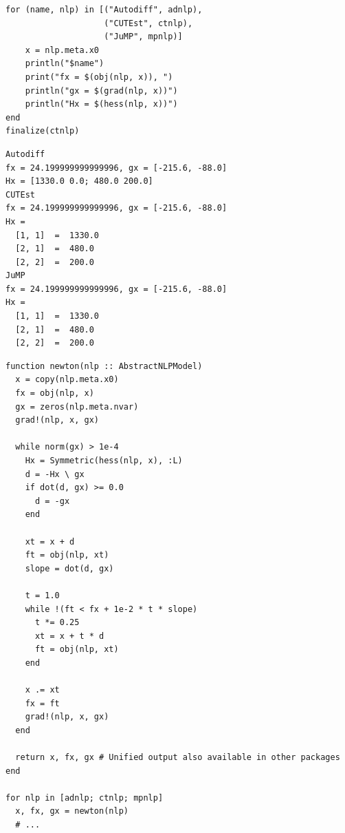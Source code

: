 \begin{frame}[fragile,t]

\begin{minipage}{0.51\textwidth}
\begin{lstlisting}
for (name, nlp) in [("Autodiff", adnlp),
                    ("CUTEst", ctnlp),
                    ("JuMP", mpnlp)]
    x = nlp.meta.x0
    println("$name")
    print("fx = $(obj(nlp, x)), ")
    println("gx = $(grad(nlp, x))")
    println("Hx = $(hess(nlp, x))")
end
finalize(ctnlp)
\end{lstlisting}
\end{minipage}
\begin{minipage}{0.48\textwidth}
\begin{lstlisting}
Autodiff
fx = 24.199999999999996, gx = [-215.6, -88.0]
Hx = [1330.0 0.0; 480.0 200.0]
CUTEst
fx = 24.199999999999996, gx = [-215.6, -88.0]
Hx = 
  [1, 1]  =  1330.0
  [2, 1]  =  480.0
  [2, 2]  =  200.0
JuMP
fx = 24.199999999999996, gx = [-215.6, -88.0]
Hx = 
  [1, 1]  =  1330.0
  [2, 1]  =  480.0
  [2, 2]  =  200.0
\end{lstlisting}
\end{minipage}
\end{frame}

\begin{frame}
\begin{lstlisting}
function newton(nlp :: AbstractNLPModel)
  x = copy(nlp.meta.x0)
  fx = obj(nlp, x)
  gx = zeros(nlp.meta.nvar)
  grad!(nlp, x, gx)

  while norm(gx) > 1e-4
    Hx = Symmetric(hess(nlp, x), :L)
    d = -Hx \ gx
    if dot(d, gx) >= 0.0
      d = -gx
    end

    xt = x + d
    ft = obj(nlp, xt)
    slope = dot(d, gx)

    t = 1.0
    while !(ft < fx + 1e-2 * t * slope)
      t *= 0.25
      xt = x + t * d
      ft = obj(nlp, xt)
    end

    x .= xt
    fx = ft
    grad!(nlp, x, gx)
  end

  return x, fx, gx # Unified output also available in other packages
end

for nlp in [adnlp; ctnlp; mpnlp]
  x, fx, gx = newton(nlp)
  # ...
\end{lstlisting}
\end{frame}

